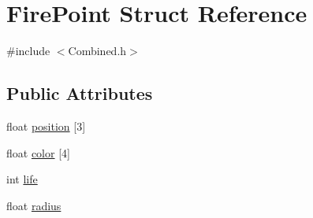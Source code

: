 \hypertarget{structFirePoint}{\section{Fire\-Point Struct Reference}
\label{structFirePoint}
}


{\ttfamily \#include $<$Combined.\-h$>$}

\subsection*{Public Attributes}
\begin{DoxyCompactItemize}
\item 
float \hyperlink{structFirePoint_a141128f363dc8dde4c2b49b46b5d0482}{position} \mbox{[}3\mbox{]}
\item 
float \hyperlink{structFirePoint_a0de87a3a5374fd7250e38300fd87a456}{color} \mbox{[}4\mbox{]}
\item 
int \hyperlink{structFirePoint_a6736d7d7f3ee957076b3e5d7afbff8da}{life}
\item 
float \hyperlink{structFirePoint_a58564702fea12d591467ab0a61bec63e}{radius}
\end{DoxyCompactItemize}


